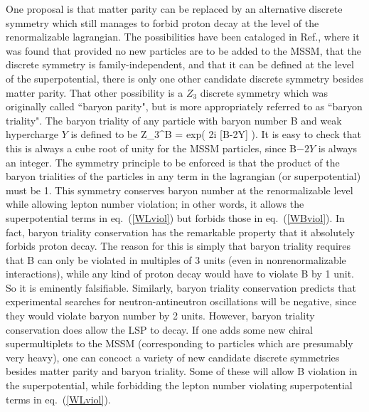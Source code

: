 One proposal is that matter parity can be replaced by an alternative
discrete symmetry which still manages to forbid proton decay
at the level of the renormalizable lagrangian. The possibilities
have been cataloged in Ref.\cite{baryonparity}, where it was
found that provided no new particles are to be added to the
MSSM, that the discrete symmetry is family-independent, and that it can be
defined at the level of the superpotential,
there is only one other candidate discrete symmetry besides matter parity.
That other possibility is a $Z_3$ discrete symmetry
\cite{baryonparity} which was originally called
``baryon parity", but is more appropriately referred to as ``baryon
triality". The baryon triality of any particle with baryon number B and
weak hypercharge $Y$ is defined to be
\beq
Z_3^{\rm B} = {\rm exp}\left ( {2\pi i} [{\rm B}-2Y] \right ).
\eeq
It is easy to check that this is always a cube root of unity for
the MSSM particles, since B$-2Y$ is always an integer.
The symmetry principle to be enforced is that the product of the
baryon trialities of the particles in any term in the lagrangian
(or superpotential) must be 1.
This symmetry conserves baryon number at the renormalizable
level while allowing lepton number violation; in other words,
it allows the superpotential terms in eq.~(\ref{WLviol}) but forbids
those in eq.~(\ref{WBviol}). In
fact, baryon triality conservation
has the remarkable property that it absolutely forbids proton 
decay.\cite{noprotondecay}
The reason for this is simply that baryon triality requires
that B can
only be violated in multiples of 3 units (even in nonrenormalizable
interactions), while any kind of
proton decay would have to violate
B by 1 unit. So it is eminently falsifiable. Similarly, baryon triality
conservation predicts that
experimental
searches for neutron-antineutron
oscillations will be negative, since they would violate baryon number by 2
units. However, baryon triality conservation does allow the LSP to decay.
If one adds some new chiral supermultiplets to the MSSM (corresponding
to particles which are presumably very heavy), one can concoct a variety
of new candidate discrete symmetries besides matter parity and baryon
triality. Some of these will allow B violation in the superpotential,
while forbidding the lepton number violating superpotential
terms in eq.~(\ref{WLviol}).

